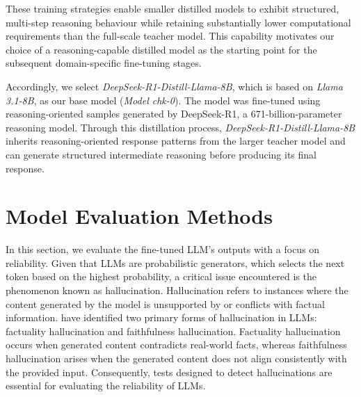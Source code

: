These training strategies enable smaller distilled models to exhibit structured, multi-step reasoning behaviour while retaining substantially lower computational requirements than the full-scale teacher model. This capability motivates our choice of a reasoning-capable distilled model as the starting point for the subsequent domain-specific fine-tuning stages.


Accordingly, we select \textit{DeepSeek-R1-Distill-Llama-8B}, which is based on \textit{Llama 3.1-8B}, as our base model (\textit{Model chk-0}). The model was fine-tuned using reasoning-oriented samples generated by DeepSeek-R1, a 671-billion-parameter reasoning model. Through this distillation process, \textit{DeepSeek-R1-Distill-Llama-8B} inherits reasoning-oriented response patterns from the larger teacher model and can generate structured intermediate reasoning before producing its final response.









\section{Model Evaluation Methods}\label{ch2:sec:application}


In this section, we evaluate the fine-tuned LLM's outputs with a focus on reliability. Given that LLMs are probabilistic generators, which selects the next token based on the highest probability, a critical issue encountered is the phenomenon known as hallucination. Hallucination refers to instances where the content generated by the model is unsupported by or conflicts with factual information. \cite{huang2025survey} have identified two primary forms of hallucination in LLMs: factuality hallucination and faithfulness hallucination. Factuality hallucination occurs when generated content contradicts real-world facts, whereas faithfulness hallucination arises when the generated content does not align consistently with the provided input. Consequently, tests designed to detect hallucinations are essential for evaluating the reliability of LLMs.





